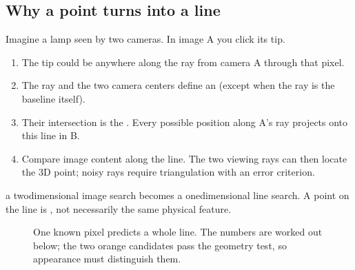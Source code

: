 \documentclass[letterpaper,11pt,english,openany,oneside]{jupyterBook}
\begin{document}
\subsection{Why a point turns into a line}
\label{\detokenize{lectures/lecture04/epipolar-practice:why-a-point-turns-into-a-line}}\label{\detokenize{lectures/lecture04/epipolar-practice:epipolar-ray-plane}}
\sphinxAtStartPar
Imagine a lamp seen by two cameras. In image A you click its tip.
\begin{enumerate}
%
\item {}
\sphinxAtStartPar
{} The tip could be anywhere along the ray from camera A through that pixel.

\item {}
\sphinxAtStartPar
{} The ray and the two camera centers define an  (except when the ray is the baseline itself).

\item {}
\sphinxAtStartPar
{} Their intersection is the . Every possible position along A’s ray projects onto this line in B.

\item {}
\sphinxAtStartPar
{} Compare image content along the line. The two viewing rays can then locate the 3D point; noisy rays require triangulation with an error criterion.

\end{enumerate}

\sphinxAtStartPar
{} a two\sphinxhyphen{}dimensional image search becomes a one\sphinxhyphen{}dimensional line search. A point on the line is , not necessarily the same physical feature.

\begin{figure}[H]
\centering
\capstart

\noindent{}
\caption{One known pixel predicts a whole line. The numbers are worked out below; the two orange candidates pass the geometry test, so appearance must distinguish them.}\label{\detokenize{lectures/lecture04/epipolar-practice:fig-lec04-epipolar-search}}\end{figure}
\end{document}
